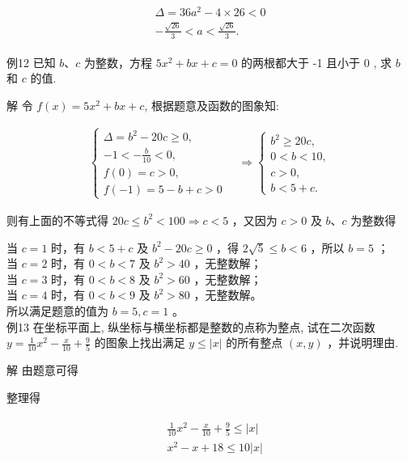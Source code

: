 \documentclass[10pt]{article}
\begin{document}
\begin{align*}
\begin{gathered}
\Delta=36 a^{2}-4 \times 26<0 \\
-\frac{\sqrt{26}}{3}<a<\frac{\sqrt{26}}{3} .
\end{gathered}
\end{align*}

例12 已知 $b 、 c$ 为整数，方程 $5 x^{2}+b x+c=0$ 的两根都大于 -1 且小于 0 , 求 $b$ 和 $c$ 的值.

解 令 $f(x)=5 x^{2}+b x+c$, 根据题意及函数的图象知:

\begin{align*}
\left\{\begin{array} { l } 
{ \Delta = b ^ { 2 } - 2 0 c \geqslant 0 , } \\
{ - 1 < - \frac { b } { 1 0 } < 0 , } \\
{ f ( 0 ) = c > 0 , } \\
{ f ( - 1 ) = 5 - b + c > 0 }
\end{array} \quad \Rightarrow \left\{\begin{array}{l}
b^{2} \geqslant 20 c, \\
0<b<10, \\
c>0, \\
b<5+c .
\end{array}\right.\right.
\end{align*}

则有上面的不等式得 $20 c \leqslant b^{2}<100 \Rightarrow c<5$ ，又因为 $c>0$ 及 $b 、 c$ 为整数得

当 $c=1$ 时，有 $b<5+c$ 及 $b^{2}-20 c \geqslant 0$ ，得 $2 \sqrt{5} \leqslant b<6$ ，所以 $b=5$ ；\\
当 $c=2$ 时，有 $0<b<7$ 及 $b^{2}>40$ ，无整数解；\\
当 $c=3$ 时，有 $0<b<8$ 及 $b^{2}>60$ ，无整数解；\\
当 $c=4$ 时，有 $0<b<9$ 及 $b^{2}>80$ ，无整数解。\\
所以满足题意的值为 $b=5, c=1$ 。\\
例13 在坐标平面上, 纵坐标与横坐标都是整数的点称为整点, 试在二次函数 $y=\frac{1}{10} x^{2}-\frac{x}{10}+\frac{9}{5}$ 的图象上找出满足 $y \leqslant|x|$ 的所有整点 $(x, y)$ ，并说明理由.

解 由题意可得

整理得

\begin{align*}
\begin{aligned}
& \frac{1}{10} x^{2}-\frac{x}{10}+\frac{9}{5} \leqslant|x| \\
& x^{2}-x+18 \leqslant 10|x|
\end{aligned}
\end{align*}
\end{document}
